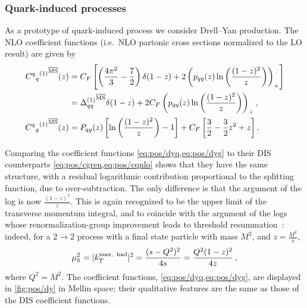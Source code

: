 \subsubsection{Quark-induced processes}
\label{sec:pos/dy}
As a prototype of quark-induced process we consider Drell--Yan
production. The NLO coefficient functions (i.e.\ NLO partonic
cross sections normalized to the LO result) are given by 
\begin{align}\label{eq:pos/dyq}
 {{C^q{}_q}^{(1)}}^{{\overline{\textrm{MS}}}}(z)&= C_F\left[
 \left(\frac{4\pi^2}{3} - \frac 7 2\right)\delta(1-z) + 2
 \left(p_{qq}(z) \ln\left(\frac{(1-z)^2}{z}\right)
 \right)_+\right]\nonumber  \\
 &={\Delta_{qq}^{(1)}}^{{\overline{\textrm{MS}}}}\delta(1-z) + 2 C_F \left(p_{qq}(z) \ln\left(\frac{(1-z)^2}{z}\right) \right)_+,\\
 \label{eq:pos/dyg}
  {{C^q{}_g}^{(1)}}^{{\overline{\textrm{MS}}}}(z)&= P_{qg}(z) \left[ \ln\left(\frac{(1-z)^2}{z}\right) - 1 \right]
  + C_F\left[\frac 3 2 -  \frac 3 2 z^2 + z\right].
\end{align}


Comparing the coefficient functions \cref{eq:pos/dyq,eq:pos/dyg} to their DIS
counterparts \cref{eq:pos/cgren,eq:pos/cqnlo} shows that they have the same
structure, with a residual logarithmic contribution proportional to the
splitting function, due to over-subtraction. The only difference is that the
argument of the log is now $\frac{(1-z)^2}{z}$. 
This is again recognized to be the upper limit of the transverse momentum
integral, and to coincide with the argument of the logs whose
renormalization-group improvement leads to threshold
resummation~\cite{Forte:2002ni}: indeed, for a $2\to2$ process with a final
state particle with mass $M^2$, and $z=\frac{M^2}{s}$,
\begin{equation}\label{eq:pos/ktmaxh}
\mu_h^2=  |k_T^{\textrm{max,\, had}}|^2=\frac{(s-Q^2)^2}{4s}=\frac{Q^2(1-z)^2}{4z}\,,
\end{equation}
where $ Q^2 = M^2 $.
The coefficient functions, \cref{eq:pos/dyq,eq:pos/dyg}, are displayed in
\cref{fig:pos/dy} in Mellin space; their qualitative features are the same as those
of the DIS coefficient functions.

